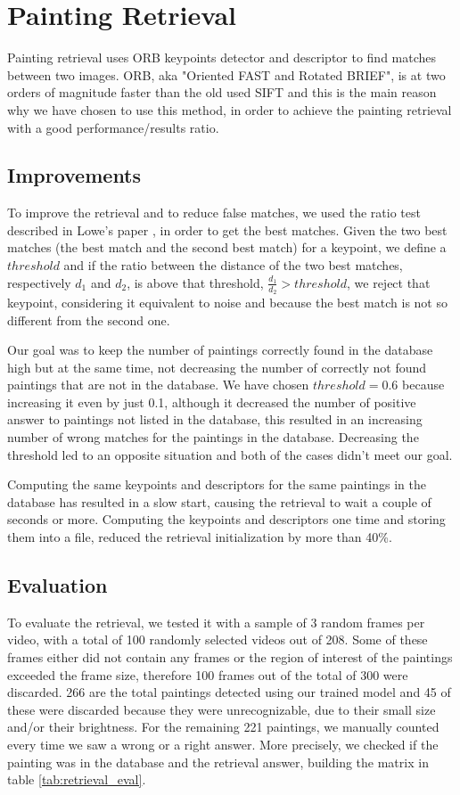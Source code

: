 \section{Painting Retrieval}
Painting retrieval uses ORB \cite{orb} keypoints detector and descriptor to find matches between two images. ORB, aka "Oriented FAST and Rotated BRIEF", is at two orders of magnitude faster than the old used SIFT \cite{sift} and this is the main reason why we have chosen to use this method, in order to achieve the painting retrieval with a good performance/results ratio.
\subsection{Improvements}
To improve the retrieval and to reduce false matches, we used the ratio test described in Lowe's paper \cite{sift}, in order to get the best matches. Given the two best matches (the best match and the second best match) for a keypoint, we define a \(threshold\) and if the ratio between the distance of the two best matches, respectively \(d_1\) and \(d_2\), is above that threshold, \(\frac{d_1}{d_2}>threshold\), we reject that keypoint, considering it equivalent to noise and because the best match is not so different from the second one. 

Our goal was to keep the number of paintings correctly found in the database high but at the same time, not decreasing the number of correctly not found paintings that are not in the database. We have chosen \(threshold = 0.6\) because increasing it even by just 0.1, although it decreased the number of positive answer to paintings not listed in the database, this resulted in an increasing number of wrong matches for the paintings in the database. Decreasing the threshold led to an opposite situation and both of the cases didn't meet our goal.

Computing the same keypoints and descriptors for the same paintings in the database has resulted in a slow start, causing the retrieval to wait a couple of seconds or more. Computing the keypoints and descriptors one time and storing them into a file, reduced the retrieval initialization by more than 40\%.
\subsection{Evaluation}
To evaluate the retrieval, we tested it with a sample of 3 random frames per video, with a total of 100 randomly selected videos out of 208. Some of these frames either did not contain any frames or the region of interest of the paintings exceeded the frame size, therefore 100 frames out of the total of 300 were discarded. 266 are the total paintings detected using our trained model and 45 of these were discarded because they were unrecognizable, due to their small size and/or their brightness. 
For the remaining 221 paintings, we manually counted every time we saw a wrong or a right answer. More precisely, we checked if the painting was in the database and the retrieval answer, building the matrix in table \ref{tab:retrieval_eval}.

